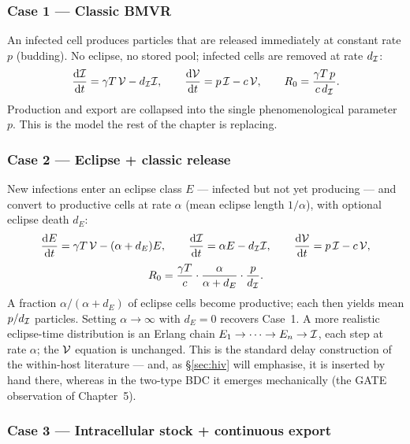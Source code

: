 \subsubsection{Case 1 --- Classic BMVR}

An infected cell produces particles that are released immediately at
constant rate $p$ (budding). No eclipse, no stored pool; infected cells are
removed at rate $d_{\mathcal{I}}$:
\begin{equation}
\displaystyle\frac{{\rm d} \mathcal{I}}{{\rm d} t}=\gamma T\,\mathcal{V}-d_{\mathcal{I}}\mathcal{I},
\qquad
\displaystyle\frac{{\rm d} \mathcal{V}}{{\rm d} t}=p\,\mathcal{I}-c\,\mathcal{V},
\qquad
R_0=\frac{\gamma T\,p}{c\,d_{\mathcal{I}}}.
\end{equation}
Production and export are collapsed into the single phenomenological
parameter $p$. This is the model the rest of the chapter is replacing.

\subsubsection{Case 2 --- Eclipse + classic release}

New infections enter an eclipse class $E$ --- infected but not yet
producing --- and convert to productive cells at rate $\alpha$ (mean
eclipse length $1/\alpha$), with optional eclipse death $d_E$:
\begin{equation}
\displaystyle\frac{{\rm d} E}{{\rm d} t}=\gamma T\,\mathcal{V}-(\alpha+d_E)E,
\qquad
\displaystyle\frac{{\rm d} \mathcal{I}}{{\rm d} t}=\alpha E-d_{\mathcal{I}}\mathcal{I},
\qquad
\displaystyle\frac{{\rm d} \mathcal{V}}{{\rm d} t}=p\,\mathcal{I}-c\,\mathcal{V},
\end{equation}
\begin{equation}
R_0=\frac{\gamma T}{c}\cdot\frac{\alpha}{\alpha+d_E}\cdot\frac{p}{d_{\mathcal{I}}}.
\end{equation}
A fraction $\alpha/(\alpha+d_E)$ of eclipse cells become productive; each
then yields mean $p/d_{\mathcal{I}}$ particles. Setting $\alpha\to\infty$ with
$d_E=0$ recovers Case~1. A more realistic eclipse-time distribution is an
Erlang chain $E_1\to\cdots\to E_n\to\mathcal{I}$, each step at rate $\alpha$;
the $\mathcal{V}$ equation is unchanged. This is the standard delay construction
of the within-host literature --- and, as \S\ref{sec:hiv} will emphasise,
it is inserted by hand there, whereas in the two-type BDC it emerges
mechanically (the GATE observation of Chapter~5).

\subsubsection{Case 3 --- Intracellular stock + continuous export}

